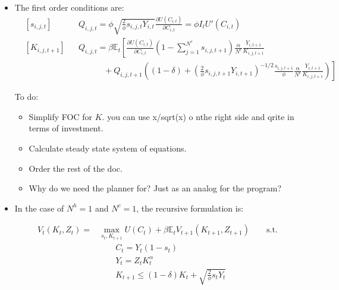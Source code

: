 \documentclass[11pt]{article}
\newcommand{\E}{\mathbb{E}}
\numberwithin{equation}{section}
\begin{document}
\begin{itemize}
	\item The first order conditions are:
	\begin{align*}
	& \left[s_{i,j,t}\right] && Q_{i,j,t} =  \phi \sqrt{\frac{2}{\phi} s_{i,j,t} Y_{i,t}} \frac{\partial U(C_{i,t})}{\partial C_{i,t}} =\phi I_t U'(C_{i,t}) \\
	& \left[K_{i,j,t+1}\right] && Q_{i,j,t} = \beta \E_t \left[  \frac{\partial U(C_{i,t})}{\partial C_{i,t}}  (1-\sum_{j=1}^{N^c} s_{i,j,t+1}) \frac{\alpha}{N^c} \frac{Y_{i,t+1}}{K_{i,j,t+1}} \right. \\
	  &   &&  \left. \quad  \qquad   +   Q_{i,j,t+1} \left( (1-\delta) + \left(\frac{2}{\phi} s_{i,j,t+1} Y_{i,t+1} \right)^{-1/2}  
	\frac{s_{i,j,t+1}}{\phi} \frac{\alpha}{N^c} \frac{Y_{i,t+1}}{K_{i,j,t+1}} \right)  \right]
	\end{align*}
	
	{\color{red} To do: 
		\begin{itemize}
			\item Simplify FOC for $K$. you can use x/sqrt(x) o nthe right side and qrite in terms of investment.
			\item Calculate steady state system of equations. 
			\item Order the rest of the doc.
			\item Why do we need the planner for? Just as an analog for the program?
		\end{itemize}}
	
%	

 \item In the case of $N^h=1$ and $N^c=1$, the recursive formulation is: 
 
 	
 \begin{align*}
 V_t\left(K_t, Z_t\right) = &\max_{s_t,K_{t+1}} U(C_t) + \beta \E_t V_{t+1}(K_{t+1}, Z_{t+1}) \qquad \text{s.t.}\\
 &\qquad
 C_t = Y_t(1-s_t)\\
 &\qquad
 Y_t = Z_t K_t^\alpha\\
 &\qquad
 K_{t+1} \leq (1-\delta) K_t + \sqrt{\frac{2}{\phi} s_t Y_t}
 \end{align*}
 

\end{itemize}
\end{document}
